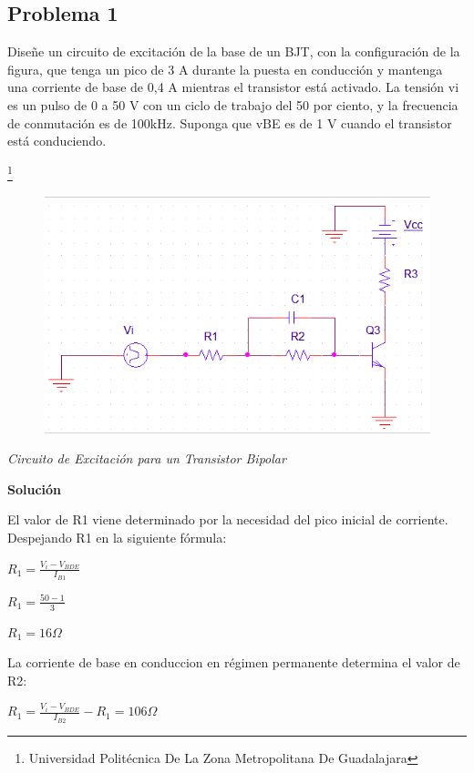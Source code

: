 \documentclass[11pt,a4paper]{article}
\begin{document}
\subsection{Problema 1} 

Diseñe un circuito de excitación de la base de un BJT, con la configuración de la figura, que tenga un pico de 3 A durante la puesta en conducción y mantenga una corriente de base de 0,4 A mientras el transistor está activado. La tensión vi es un pulso de 0 a 50 V con un ciclo de trabajo del 50 por ciento, y la frecuencia de conmutación es de 100kHz. Suponga que vBE es de 1 V cuando el transistor está conduciendo. 

\footnote{Universidad Politécnica De La Zona Metropolitana De Guadalajara} 

\newpage

\begin{figure}[hbtp]
\centering
\includegraphics[scale=0.60]{4.png}
\end{figure}
\textit{Circuito de Excitación para un Transistor Bipolar}

\textbf{Solución}

El valor de R1 viene determinado por la necesidad del pico inicial de corriente. Despejando R1 en la siguiente fórmula:

\begin{Huge}
$ R_1 = \frac{V_i - V_{BDE}}{I_{B1}} $

$ R_1 = \frac{50 - 1}{3} $

$ R_1 = 16\Omega $
\end{Huge}

 La corriente de base en conduccion en régimen permanente determina el valor de R2: 
 
 \begin{Huge}
$ R_1 = \frac{V_i - V_{BDE}}{I_{B2}} - R_1 = 106\Omega $
 \end{Huge}
 
\end{document}
